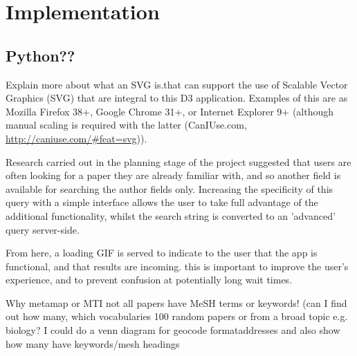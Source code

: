 \documentclass[Report.tex]{subfiles}
\begin{document}
\chapter{Implementation}
\section{Python??}
Explain more about what an SVG is.that can support the use of Scalable Vector Graphics (SVG) that are integral to this D3 application. Examples of this are as Mozilla Firefox 38+, Google Chrome 31+, or Internet Explorer 9+ (although manual scaling is required with the latter (CanIUse.com, \url{http://caniuse.com/#feat=svg})).

Research carried out in the planning stage of the project suggested that users are often looking for a paper they are already familiar with, and so another field is available for searching the author fields only. Increasing the specificity of this query with a simple interface allows the user to take full advantage of the additional functionality, whilst the search string is converted to an 'advanced' query server-side.

From here, a loading GIF is served to indicate to the user that the app is functional, and that results are incoming. this is important to improve the user's experience, and to prevent confusion at potentially long wait times.

Why metamap or MTI not all papers have MeSH terms or keywords! (can I find out how many, which vocabularies 100 random papers or from a broad topic e.g. biology? I could do a venn diagram for geocode formataddresses and also show how many have keywords/mesh headings
\end{document}
